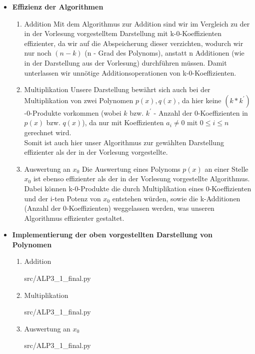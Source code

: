 \newpage
 
\begin{itemize}
	\item \textbf{Effizienz der Algorithmen} 
		\begin{enumerate}
			\item Addition
				Mit dem Algorithmus zur Addition sind wir im Vergleich zu der in der Vorlesung vorgestelltem Darstellung mit k-0-Koeffizienten effizienter, da wir auf die Abspeicherung dieser verzichten, wodurch wir nur noch $(n-k)$ (n - Grad des Polynoms), anstatt n Additionen (wie in der Darstellung aus der Vorlesung) durchführen müssen. Damit unterlassen wir unnötige Additionsoperationen von k-0-Koeffizienten. 
			\item Multiplikation
 				Unsere Darstellung bewährt sich auch bei der Multiplikation von zwei Polynomen $p(x),q(x)$, da hier keine $(k*k^')$-0-Produkte vorkommen (wobei $k$ bzw. $k^'$ - Anzahl der 0-Koeffizienten in $p(x)$ bzw. $q(x)$), da nur mit Koeffizienten $a_i \neq 0$ mit $0 \leq i \leq n$ gerechnet wird.\\
				Somit ist auch hier unser Algorithmus zur gewählten Darstellung effizienter als der in der Vorlesung vorgestellte.
			\item Auswertung an $x_0$
				Die Auswertung eines Polynoms $p(x)$ an einer Stelle $x_0$ ist ebenso effizienter als der in der Vorlesung vorgestellte Algorithmus. Dabei können k-0-Produkte die durch Multiplikation eines 0-Koeffizienten und der i-ten Potenz von $x_0$ entstehen würden, sowie die k-Additionen (Anzahl der 0-Koeffizienten) weggelassen werden, was unseren Algorithmus effizienter gestaltet. 
		\end{enumerate}
		
		\item \textbf{Implementierung der oben vorgestellten Darstellung von Polynomen}
		\begin{enumerate}
		  \item Addition		
														
			{src/ALP3_1_final.py}
		  \newpage	
		  \item Multiplikation
														
			{src/ALP3_1_final.py}
		  \item Auswertung an $x_0$
		  												
			{src/ALP3_1_final.py}
		\end{enumerate}
\end{itemize}
\newpage
